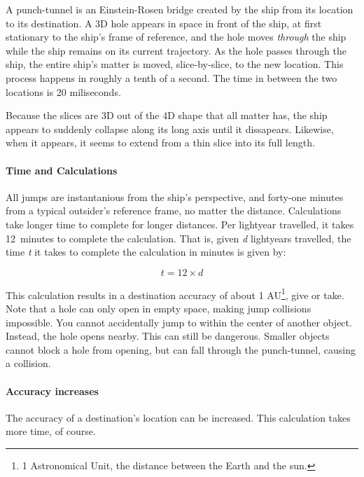 \par
A punch-tunnel is an Einstein-Rosen bridge created by the ship from its location to its destination. A 3D hole appears in space in front of the ship, at first stationary to the ship's frame of reference, and the hole moves \textit{through} the ship while the ship remains on its current trajectory. As the hole passes through the ship, the entire ship's matter is moved, slice-by-slice, to the new location. This process happens in roughly a tenth of a second. The time in between the two locations is 20 miliseconds.

\par
Because the slices are 3D out of the 4D shape that all matter has, the ship appears to suddenly collapse along its long axis until it dissapears. Likewise, when it appears, it seems to extend from a thin slice into its full length.

\newcommand{\calculationFactor}{12}
\newcommand{\energyLightyearFactor}{8^d}

\paragraph{Time and Calculations}All jumps are instantanious from the ship's perspective, and forty-one minutes from a typical outsider's reference frame, no matter the distance. Calculations take longer time to complete for longer distances. Per lightyear travelled, it takes \calculationFactor\, minutes to complete the calculation. That is, given \textit{d} lightyears travelled, the time \textit{t} it takes to complete the calculation in minutes is given by:

\[t = 12\times d\]

\par This calculation results in a destination accuracy of about 1 AU\footnote{1 Astronomical Unit, the distance between the Earth and the sun.}, give or take. Note that a hole can only open in empty space, making jump collisions impossible. You cannot accidentally jump to within the center of another object. Instead, the hole opens nearby. This can still be dangerous. Smaller objects cannot block a hole from opening, but can fall through the punch-tunnel, causing a collision.

\paragraph{Accuracy increases}The accuracy of a destination's location can be increased. This calculation takes more time, of course.

